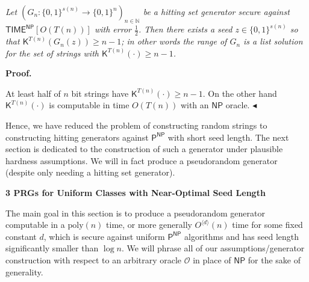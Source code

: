 \documentclass[10pt,a4paper]{article}
\begin{document}
\emph{Let $(G_{n}:\{0,1\}^{s(n)}\to\{0,1\}^{n})_{n\in\mathbb{N}}$ be a hitting set generator secure against ${\mathsf{TIME}}^{\mathsf{NP}}[O(T(n))]$ with error $\frac{1}{2}$. Then there exists a seed $z\in\{0,1\}^{s(n)}$ so that ${\mathsf{K}}^{T(n)}(G_{n}(z))\geq n-1$; in other words the range of $G_{n}$ is a list solution for the set of strings with ${\mathsf{K}}^{T(n)}(\cdot)\geq n-1$.}\par







\par\medskip\noindent\textbf{Proof.}\par




At least half of $n$ bit strings have ${\mathsf{K}}^{T(n)}(\cdot)\geq n-1$. On the other hand ${\mathsf{K}}^{T(n)}(\cdot)$ is computable in time $O(T(n))$ with an ${\mathsf{NP}}$ oracle.
$\blacktriangleleft$\par




Hence, we have reduced the problem of constructing random strings to constructing hitting generators against ${\mathsf{P}}^{{\mathsf{NP}}}$ with short seed length. The next section is dedicated to the construction of such a generator under plausible hardness assumptions. We will in fact produce a pseudorandom generator (despite only needing a hitting set generator).\par







\par\medskip\noindent\textbf{
3 PRGs for Uniform Classes with Near-Optimal Seed Length}\par




The main goal in this section is to produce a pseudorandom generator computable in a $\mathrm{poly}(n)$ time, or more generally $O^{\langle d\rangle}(n)$ time for some fixed constant $d$, which is secure against uniform ${\mathsf{P}}^{{\mathsf{NP}}}$ algorithms and has seed length significantly smaller than $\log n$. We will phrase all of our assumptions/generator construction with respect to an arbitrary oracle $\mathcal{O}$ in place of ${\mathsf{NP}}$ for the sake of generality.\par
\end{document}
